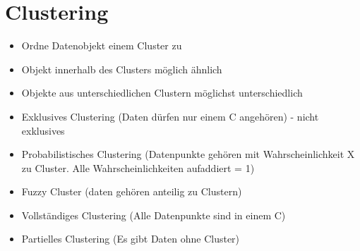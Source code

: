 \documentclass[a4paper]{article}
\begin{document}
\begin{landscape}
\begin{multicols}{3}
\begin{itemize}
\begin{itemize}
                \end{itemize}
        \end{itemize}

    \section{Clustering}
    \begin{itemize}[noitemsep,nolistsep]
        \item Ordne Datenobjekt einem Cluster zu 
        \item Objekt innerhalb des Clusters möglich ähnlich 
        \item Objekte aus unterschiedlichen Clustern möglichst unterschiedlich
        \item Exklusives Clustering (Daten dürfen nur einem C angehören) - nicht exklusives 
        \item Probabilistisches Clustering (Datenpunkte gehören mit Wahrscheinlichkeit X zu Cluster. Alle Wahrscheinlichkeiten aufaddiert = 1)
        \item Fuzzy Cluster (daten gehören anteilig zu Clustern)
        \item Vollständiges Clustering (Alle Datenpunkte sind in einem C)
        \item Partielles Clustering (Es gibt Daten ohne Cluster)
    \end{itemize}


\end{multicols}
\end{landscape}
\end{document}
